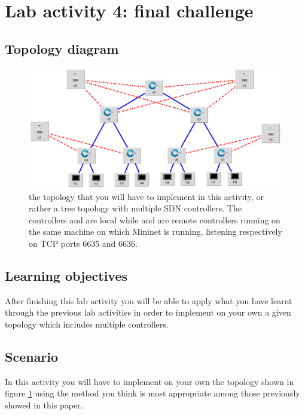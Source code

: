 \section*{Lab activity 4: final challenge}

\subsection*{Topology diagram}
\begin{figure}[htb]
	\centering
	\includegraphics[width=1\linewidth]{img/challange-topology.png}
	\caption{the topology that you will have to implement in this activity, or rather
  a tree topology with multiple SDN controllers.
  The controllers  and  are local while  and 
  are remote controllers running on the same machine on which Mininet is running,
	listening respectively on TCP ports 6635 and 6636.}
	\label{fig:challenge-topology}
\end{figure}




\subsection*{Learning objectives}
After finishing this lab activity you will be able to apply what you have learnt
through the previous lab activities in order to implement on your own a given
topology which includes multiple controllers.





\subsection*{Scenario}
In this activity you will have to implement on your own the topology shown in
figure \ref{fig:challenge-topology} using the method you think is most appropriate
among those previously showed in this paper.


